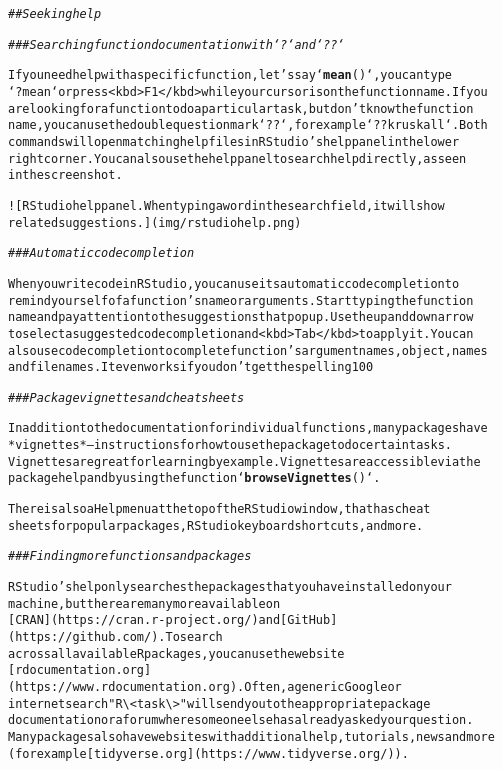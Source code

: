 \documentclass{article}\usepackage[]{graphicx}\usepackage[]{xcolor}
\makeatletter
\newcommand{\hlstr}[1]{\textcolor[rgb]{0.192,0.494,0.8}{#1}}%
\newcommand{\hlcom}[1]{\textcolor[rgb]{0.678,0.584,0.686}{\textit{#1}}}%
\newcommand{\hlkwd}[1]{\textcolor[rgb]{0.737,0.353,0.396}{\textbf{#1}}}%
\newenvironment{kframe}{%
 \def\at@end@of@kframe{}%
 \ifinner\ifhmode%
  \def\at@end@of@kframe{\end{minipage}}%
  \begin{minipage}{\columnwidth}%
 \fi\fi%
 \def\FrameCommand##1{\hskip\@totalleftmargin \hskip-\fboxsep
 \colorbox{shadecolor}{##1}\hskip-\fboxsep
     \hskip-\linewidth \hskip-\@totalleftmargin \hskip\columnwidth}%
 \MakeFramed {\advance\hsize-\width
   \@totalleftmargin\z@ \linewidth\hsize
   \@setminipage}}%
 {\par\unskip\endMakeFramed%
 \at@end@of@kframe}
\newenvironment{knitrout}{}{} %
\makeatother
\begin{document}
\begin{knitrout}
\begin{kframe}
\begin{alltt}
\hlcom{## Seeking help}

\hlcom{### Searching function documentation with `?` and `??`}

If you need help with a specific function, let's say `\hlkwd{mean}()`, you can type
`?mean` or press <kbd>F1</kbd> while your cursor is on the function name. If you
are looking for a function to do a particular task, but don't know the function
name, you can use the double question mark `??`, for example `??kruskall`. Both
commands will open matching help files in RStudio's help panel in the lower
right corner. You can also use the help panel to search help directly, as seen
in the screenshot.

![RStudio help panel. When typing a word in the search field, it will show
related suggestions.](img/rstudiohelp.png)

\hlcom{### Automatic code completion}

When you write code in RStudio, you can use its automatic code completion to
remind yourself of a function's name or arguments. Start typing the function
name and pay attention to the suggestions that pop up. Use the up and down arrow
to select a suggested code completion and <kbd>Tab</kbd> to apply it. You can
also use code completion to complete function's argument names, object, names
and file names. It even works if you don't get the spelling 100% correct.

\hlcom{### Package vignettes and cheat sheets}

In addition to the documentation for individual functions, many packages have
*vignettes* -- instructions for how to use the package to do certain tasks.
Vignettes are great for learning by example. Vignettes are accessible via the
package help and by using the function `\hlkwd{browseVignettes}()`.

There is also a Help menu at the top of the RStudio window, that has cheat
sheets for popular packages, RStudio keyboard shortcuts, and more.

\hlcom{### Finding more functions and packages}

RStudio's help only searches the packages that you have installed on your
machine, but there are many more available on
[CRAN](https://cran.r-project.org/) and [GitHub](https://github.com/). To search
across all available R packages, you can use the website
[rdocumentation.org](https://www.rdocumentation.org). Often, a generic Google or
internet search \hlstr{"R \textbackslash{}<task\textbackslash{}>"} will send you to the appropriate package
documentation or a forum where someone else has already asked your question.
Many packages also have websites with additional help, tutorials, news and more
(for example [tidyverse.org](https://www.tidyverse.org/)).


\end{alltt}
\end{kframe}
\end{knitrout}
\end{document}
